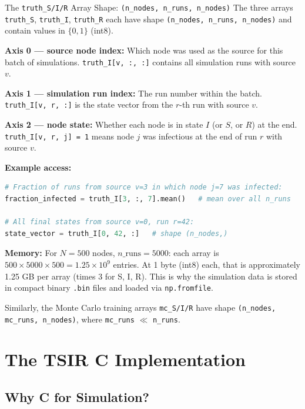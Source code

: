 \begin{conceptbox}{The \texttt{truth\_S/I/R} Array Shape: \texttt{(n\_nodes, n\_runs, n\_nodes)}}
The three arrays \texttt{truth\_S}, \texttt{truth\_I}, \texttt{truth\_R} each have shape \texttt{(n\_nodes, n\_runs, n\_nodes)} and contain values in $\{0, 1\}$ (int8).

\textbf{Axis 0 --- source node index:} Which node was used as the source for this batch of simulations. \texttt{truth\_I[v, :, :]} contains all simulation runs with source $v$.

\textbf{Axis 1 --- simulation run index:} The run number within the batch. \texttt{truth\_I[v, r, :]} is the state vector from the $r$-th run with source $v$.

\textbf{Axis 2 --- node state:} Whether each node is in state $I$ (or $S$, or $R$) at the end. \texttt{truth\_I[v, r, j] = 1} means node $j$ was infectious at the end of run $r$ with source $v$.

\textbf{Example access:}
\begin{lstlisting}[language=Python]
# Fraction of runs from source v=3 in which node j=7 was infected:
fraction_infected = truth_I[3, :, 7].mean()   # mean over all n_runs

# All final states from source v=0, run r=42:
state_vector = truth_I[0, 42, :]   # shape (n_nodes,)
\end{lstlisting}

\medskip
\textbf{Memory:} For $N = 500$ nodes, $n\_\text{runs} = 5000$: each array is $500 \times 5000 \times 500 = 1.25 \times 10^9$ entries. At 1 byte (int8) each, that is approximately 1.25 GB per array (times 3 for S, I, R). This is why the simulation data is stored in compact binary \texttt{.bin} files and loaded via \texttt{np.fromfile}.
\end{conceptbox}

Similarly, the Monte Carlo training arrays \texttt{mc\_S/I/R} have shape \texttt{(n\_nodes, mc\_runs, n\_nodes)}, where \texttt{mc\_runs} $\ll$ \texttt{n\_runs}.

\section{The TSIR C Implementation}
\label{sec:tsir_code}

\subsection{Why C for Simulation?}

